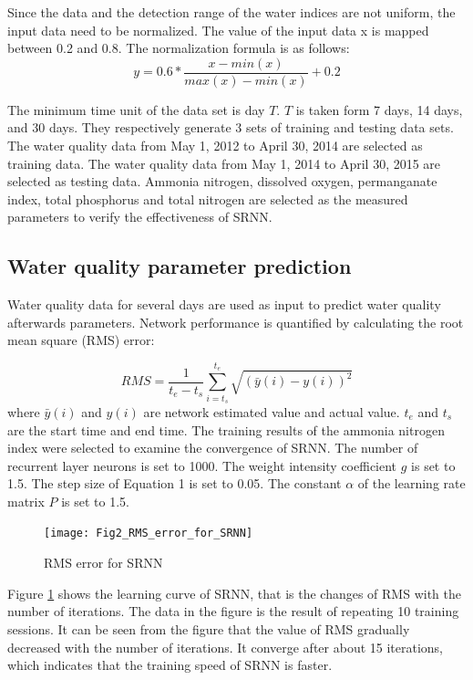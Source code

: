 \documentclass[runningheads]{llncs}
\begin{document}
Since the data and the detection range of the water indices are not 
uniform, the input data need to be normalized. The value of the 
input data x is mapped between 0.2 and 0.8. The normalization formula is as follows:
\begin{equation}
y=0.6*\frac{x-min(x)}{max(x)-min(x)}+0.2  
\end{equation}

The minimum time unit of the data set is day $T$. $T$ is taken form 7 days, 14 days, 
and 30 days. They respectively generate 3 sets of training and 
testing data sets. The water quality data from 
May 1, 2012 to April 30, 2014 are selected as training data. 
The water quality data  from May 1, 
2014 to April 30, 2015 are selected as testing data.
Ammonia nitrogen, dissolved oxygen, permanganate index, 
total phosphorus and total nitrogen are selected as the 
measured parameters to verify the effectiveness of SRNN.

\subsection{Water quality parameter prediction}
Water quality data for several days are used as input to 
predict water quality afterwards parameters. Network performance 
is quantified by calculating the root mean square (RMS) error:

\begin{equation}
RMS=  \frac{1}{t_e-t_s}\sum_{i=t_s}^{t_e}\sqrt{(\bar y(i)- y(i))^2}
\end{equation}
where $\bar y(i)$ and $y(i)$ are network estimated value and actual value. 
$t_e$ and $t_s$ are the start time and end time. The training results of the ammonia 
nitrogen index were selected to examine the convergence of SRNN. 
The number of recurrent layer neurons is set to 1000.
The weight intensity coefficient $g$ is set to 1.5. 
The step size of Equation 1 is set to 0.05. 
The constant $\alpha$ of the learning rate matrix $P$ is set to 1.5.
\begin{figure}[htbp]
\centering
\texttt{[image: Fig2\_RMS\_error\_for\_SRNN]}
\caption{RMS error for SRNN}
\label{RMS error for SRNN}
\end{figure}

Figure \ref{RMS error for SRNN} shows the learning curve of SRNN, that is the changes of 
RMS with the number of iterations. The data in the figure is the 
result of repeating 10 training sessions. 
It can be seen from the figure that the value of RMS 
gradually decreased with the number of iterations. 
It converge after about 15 iterations, which indicates that the training 
speed of SRNN is faster.
\end{document}
